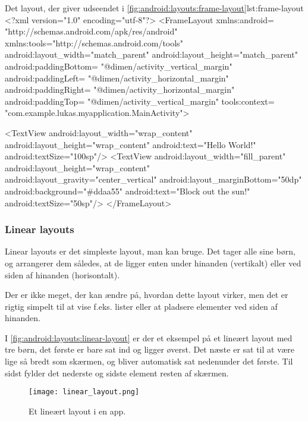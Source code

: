 \begin{XmlCode}{Det layout, der giver udseendet i \autoref{fig:android:layouts:frame-layout}}{lst:frame-layout}
	<?xml version="1.0" encoding="utf-8"?>
	<FrameLayout 
		xmlns:android=
			"http://schemas.android.com/apk/res/android"
		xmlns:tools="http://schemas.android.com/tools"
		android:layout_width="match_parent"
		android:layout_height="match_parent"
		android:paddingBottom=
			"@dimen/activity_vertical_margin"
		android:paddingLeft=
			"@dimen/activity_horizontal_margin"
		android:paddingRight=
			"@dimen/activity_horizontal_margin"
		android:paddingTop=
			"@dimen/activity_vertical_margin"
		tools:context=
			"com.example.lukas.myapplication.MainActivity">
	
		<TextView
			android:layout_width="wrap_content"
			android:layout_height="wrap_content"
			android:text="Hello World!"
			android:textSize="100sp"/>
		<TextView
			android:layout_width="fill_parent"
			android:layout_height="wrap_content"
			android:layout_gravity="center_vertical"
			android:layout_marginBottom="50dp"
			android:background="#ddaa55"
			android:text="Block out the sun!"
			android:textSize="50sp"/>
	</FrameLayout>
\end{XmlCode}

\clearpage
\FloatBarrier

\subsubsection{Linear layouts}
Linear layouts er det simpleste layout, man kan bruge. Det tager alle sine 
børn, og arrangerer dem således, at de ligger enten under hinanden (vertikalt) 
eller ved siden af hinanden (horisontalt).

Der er ikke meget, der kan ændre på, hvordan dette layout virker, men det er 
rigtig simpelt til at vise f.eks. lister eller at pladsere elementer ved siden 
af hinanden.

I \autoref{fig:android:layouts:linear-layout} er der et eksempel på et lineært 
layout med tre børn, det første er bare sat ind og ligger øverst. Det næste er 
sat til at være lige så bredt som skærmen, og bliver automatisk sat nedenunder 
det første. Til sidst fylder det nederste og sidste element resten af skærmen.

\begin{figure}[h]
	\begin{center}
		\texttt{[image: linear\_layout.png]}
		\caption{Et lineært layout i en app.}
		\label{fig:android:layouts:linear-layout}
	\end{center}
\end{figure}

